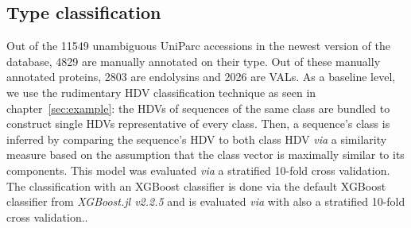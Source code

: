 \subsection*{Type classification}
Out of the 11549 unambiguous UniParc accessions in the newest version of the database, 4829 are manually annotated on their type. Out of these manually annotated proteins, 2803 are endolysins and 2026 are VALs. As a baseline level, we use the rudimentary HDV classification technique as seen in chapter~\ref{sec:example}: the HDVs of sequences of the same class are bundled to construct single HDVs representative of every class. Then, a sequence's class is inferred by comparing the sequence's HDV to both class HDV \textit{via} a similarity measure based on the assumption that the class vector is maximally similar to its components. This model was evaluated \textit{via} a stratified 10-fold cross validation. The classification with an XGBoost classifier is done via the default XGBoost classifier from \textit{XGBoost.jl v2.2.5} and is evaluated \textit{via}  with also a stratified 10-fold cross validation..